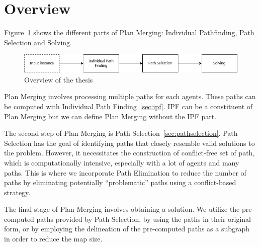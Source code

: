 \section{Overview}
Figure~\ref{fig:overview} shows the different parts of Plan Merging: Individual Pathfinding, Path Selection and Solving.

\begin{figure}[H]
    \centering
    \caption{Overview of the thesis}\label{fig:overview}
    \includegraphics[width=\widthimg]{img/overview.drawio.png}
\end{figure}

Plan Merging involves processing multiple paths for each agents. These paths can be computed with Individual Path Finding~\ref{sec:ipf}. IPF can be a constituent of Plan Merging but we can define Plan Merging without the IPF part.

The second step of Plan Merging is Path Selection~\ref{sec:pathselection}. Path Selection has the goal of identifying paths that closely resemble valid solutions to the problem. However, it necessitates the construction of conflict-free set of path, which is computationally intensive, especially with a lot of agents and many paths. This is where we incorporate Path Elimination to reduce the number of paths by eliminating potentially ``problematic'' paths using a conflict-based strategy.

The final stage of Plan Merging involves obtaining a solution. We utilize the pre-computed paths provided by Path Selection, by using the paths in their original form, or by employing the delineation of the pre-computed paths as a subgraph in order to reduce the map size.





